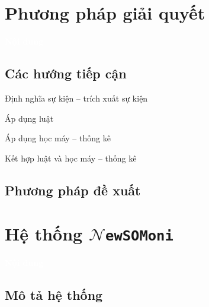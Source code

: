 \documentclass{beamer}
\numberwithin{equation}{section}
\newcommand{\trang}[1]{\textcolor{white}{#1}}
\begin{document}
\section{Phương pháp giải quyết}
  \begin{frame}{\trang{\LARGE \bf{Nội dung}}}
  \end{frame}
  \subsection{Các hướng  tiếp cận}

  \begin{frame}{Định nghĩa sự kiện -- trích xuất sự kiện}

    \end{frame}


  \begin{frame}{Áp dụng luật}

    \end{frame}

  \begin{frame}{Áp dụng học máy -- thống kê}

    \end{frame}

  \begin{frame}{Kết hợp luật và học máy -- thống kê}

    \end{frame}
  \subsection{Phương pháp đề xuất}




\section{Hệ thống $\mathcal{N}$\texttt{ewSOMoni}}
  \begin{frame}{\trang{\LARGE \bf{Nội dung}}}
  \end{frame}
 \subsection{Mô tả hệ thống}
\end{document}
